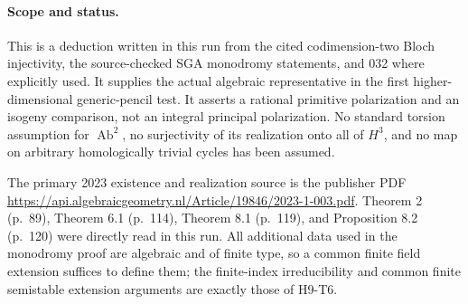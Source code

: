 \paragraph{Scope and status.}
This is a deduction written in this run from the cited codimension-two
Bloch injectivity, the source-checked SGA monodromy statements, and 032
where explicitly used. It supplies the actual algebraic representative
in the first higher-dimensional generic-pencil test. It asserts a
rational primitive polarization and an isogeny comparison, not an
integral principal polarization. No standard torsion assumption for
$\operatorname{Ab}^2$, no surjectivity of its realization onto all of
$H^3$, and no map on arbitrary homologically trivial cycles has been
assumed.

The primary 2023 existence and realization source is the publisher PDF
\url{https://api.algebraicgeometry.nl/Article/19846/2023-1-003.pdf}.
Theorem 2 (p.~89), Theorem 6.1 (p.~114), Theorem 8.1 (p.~119), and
Proposition 8.2 (p.~120) were directly read in this run. All additional
data used in the monodromy proof are algebraic and of finite type, so
a common finite field extension suffices to define them; the
finite-index irreducibility and common finite semistable extension
arguments are exactly those of H9-T6.
